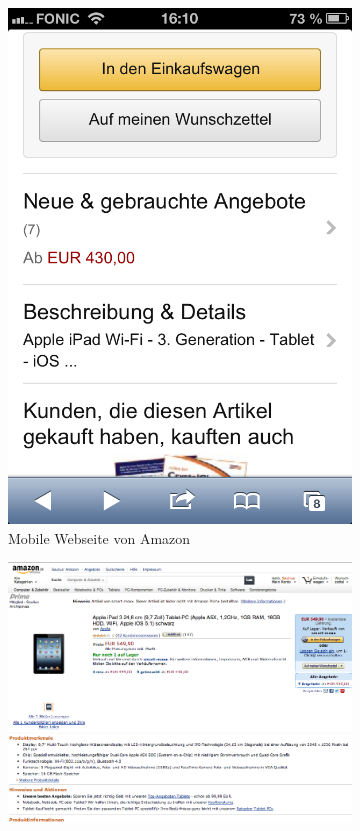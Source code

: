 \begin{figure}
	\centering
	\begin{subfigure}[b]{0.3\textwidth}
		\centering
		\includegraphics[width=1\textwidth]{img/amazon.png}
		\caption{Mobile Webseite von Amazon}\label{fig:amazon}
	\end{subfigure}
	\begin{subfigure}[b]{0.6\textwidth}
		\centering
		\includegraphics[width=1\textwidth]{img/amazonFull.png}

\end{subfigure}
\end{figure}
